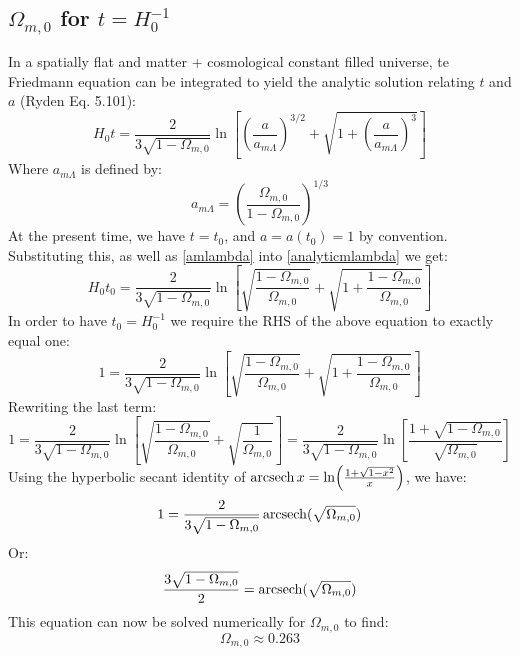 \subsection{$\Omega_{m, 0}$ for $t = H_0^{-1}$}
In a spatially flat and matter + cosmological constant filled universe, te Friedmann equation can be integrated to yield the analytic solution relating $t$ and $a$ (Ryden Eq. 5.101):
\begin{equation}\label{analyticmlambda}
    H_0t = \frac{2}{3\sqrt{1 - \Omega_{m, 0}}}\ln\left[\left(\frac{a}{a_{m\Lambda}}\right)^{3/2} + \sqrt{1 + \left(\frac{a}{a_{m\Lambda}}\right)^3}\right]
\end{equation}
Where $a_{m\Lambda}$ is defined by:
\begin{equation}\label{amlambda}
    a_{m\Lambda} = \left(\frac{\Omega_{m,0}}{1 - \Omega_{m, 0}}\right)^{1/3}
\end{equation}
At the present time, we have $t = t_0$, and $a = a(t_0) = 1$ by convention. Substituting this, as well as \eqref{amlambda} into \eqref{analyticmlambda} we get:
\begin{equation}
    H_0t_0 = \frac{2}{3\sqrt{1 - \Omega_{m, 0}}}\ln\left[\sqrt{\frac{1-\Omega_{m, 0}}{\Omega_{m, 0}}} + \sqrt{1 + \frac{1-\Omega_{m, 0}}{\Omega_{m, 0}}}\right]
\end{equation}
In order to have $t_0 = H_0^{-1}$ we require the RHS of the above equation to exactly equal one:
\begin{equation}
    1 = \frac{2}{3\sqrt{1 - \Omega_{m, 0}}}\ln\left[\sqrt{\frac{1-\Omega_{m, 0}}{\Omega_{m, 0}}} + \sqrt{1 + \frac{1-\Omega_{m, 0}}{\Omega_{m, 0}}}\right]
\end{equation}
Rewriting the last term:
\begin{equation}
    1 = \frac{2}{3\sqrt{1 - \Omega_{m, 0}}}\ln\left[\sqrt{\frac{1-\Omega_{m, 0}}{\Omega_{m, 0}}} + \sqrt{\frac{1}{\Omega_{m, 0}}}\right] = \frac{2}{3\sqrt{1 - \Omega_{m, 0}}}\ln\left[\frac{1 + \sqrt{1 - \Omega_{m, 0}}}{\sqrt{\Omega_{m, 0}}}\right]
\end{equation}
Using the hyperbolic secant identity of $\operatorname{arcsech} x = \ln(\frac{1 + \sqrt{1 - x^2}}{x})$, we have:
\begin{equation}
    1 = \frac{2}{3\sqrt{1 - \Omega_{m, 0}}}\operatorname{arcsech}(\sqrt{\Omega_{m, 0}})
\end{equation}
Or:
\begin{equation}\label{59exp}
    \frac{3\sqrt{1 - \Omega_{m, 0}}}{2} = \operatorname{arcsech}(\sqrt{\Omega_{m, 0}})
\end{equation}
This equation can now be solved numerically for $\Omega_{m, 0}$ to find:
\begin{equation}
    \boxed{\Omega_{m, 0} \approx 0.263}
\end{equation}


